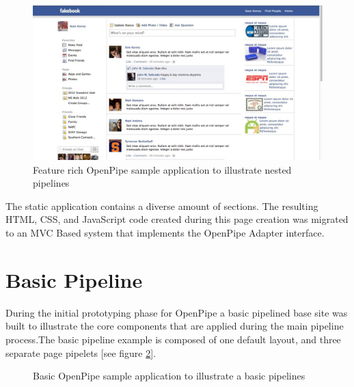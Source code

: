 \documentclass[12pt]{report}
\begin{document}
\begin{figure}[H]
\caption{Feature rich OpenPipe sample application to illustrate nested pipelines}
\label{fig:sampleApp}
\centering
\includegraphics[width=\textwidth,keepaspectratio]{figures/images/sample_app.jpg}
\end{figure}

The static application contains a diverse amount of sections. The resulting HTML, CSS, and JavaScript code created during this page creation was migrated to an MVC Based system that implements the OpenPipe Adapter interface.


\section{Basic Pipeline}

During the initial prototyping phase for OpenPipe a basic pipelined base site was built to illustrate the core components that are applied during the main pipeline process.The basic pipeline example is composed of one default layout, and three separate page pipelets [see figure \ref{fig:basicPipeline}]. 

\begin{figure}[H]
\caption{Basic OpenPipe sample application to illustrate a basic pipelines}
\label{fig:basicPipeline}
\centering
{}
\end{figure}
\end{document}
